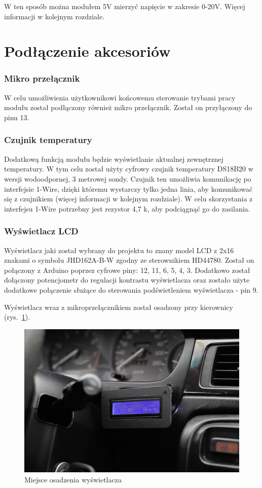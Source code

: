 W ten sposób można modułem 5V mierzyć napięcie w zakresie 0-20V. Więcej informacji w kolejnym rozdziale.

\section{Podłączenie akcesoriów}

\subsubsection{Mikro przełącznik}
W celu umożliwienia użytkownikowi końcowemu sterowanie trybami pracy modułu został podłączony również mikro przełącznik. Został on przyłączony do pinu 13.

\subsubsection{Czujnik temperatury}
Dodatkową funkcją modułu będzie wyświetlanie aktualnej zewnętrznej temperatury. W tym celu został użyty cyfrowy czujnik temperatury DS18B20 w wersji wodoodpornej, 3 metrowej sondy. Czujnik ten umożliwia komunikację po interfejsie 1-Wire, dzięki któremu wystarczy tylko jedna linia, aby komunikować się z czujnikiem (więcej informacji w kolejnym rozdziale). W celu skorzystania z interfejsu 1-Wire potrzebny jest rezystor 4,7 k\textOmega, aby podciągnąć go do zasilania.

\subsubsection{Wyświetlacz LCD}
Wyświetlacz jaki został wybrany do projektu to znany model LCD z 2x16 znakami o symbolu JHD162A-B-W zgodny ze sterownikiem HD44780. Został on połączony z Arduino poprzez cyfrowe piny: 12, 11, 6, 5, 4, 3. Dodatkowo został dołączony potencjometr do regulacji kontrastu wyświetlacza oraz zostało użyte dodatkowe połączenie służące do sterowania podświetleniem wyświetlacza - pin 9.

\par Wyświetlacz wraz z mikroprzełącznikiem został osadzony przy kierownicy (rys.~\ref{fig:arduino_lcd}).
\begin{figure}[!h]
\centering
\includegraphics[width=0.8\linewidth]{Rysunki/arduino_lcd.jpg}
\caption{Miejsce osadzenia wyświetlacza}
\label{fig:arduino_lcd}
\end{figure}
